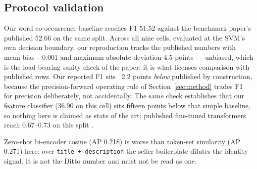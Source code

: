 \documentclass[conference]{IEEEtran}
\begin{document}
\subsection{Protocol validation}
Our word co-occurrence baseline reaches F1 51.52 against the benchmark paper's published 52.66 on the same
split. Across all nine cells, evaluated at the SVM's own decision boundary, our reproduction tracks the
published numbers with mean bias $-0.001$ and maximum absolute deviation 4.5 points --- unbiased, which is
the load-bearing sanity check of the paper: it is what licenses comparison with published rows. Our reported
F1 sits ~2.2 points \emph{below} published by construction, because the precision-forward operating rule of
Section~\ref{sec:method} trades F1 for precision deliberately, not accidentally.
The same check establishes that our feature classifier (36.90 on this cell) sits fifteen points below that
simple baseline, so nothing here is claimed as state of the art; published fine-tuned transformers reach
0.67--0.73 on this split \cite{peeters2024wdc}.



Zero-shot bi-encoder cosine (AP 0.218) is worse than token-set similarity (AP 0.271) here: over
\texttt{title + description} the seller boilerplate dilutes the identity signal. It is not the Ditto number
and must not be read as one.
\end{document}
